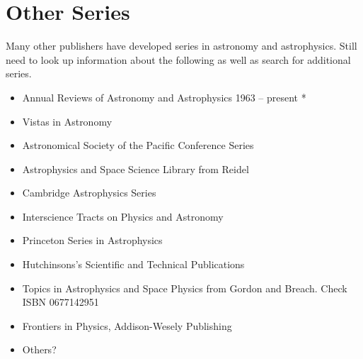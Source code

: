 \section{Other Series}

Many other publishers have developed series in astronomy and
astrophysics.  Still need to look up information about the following
as well as search for additional series.

\begin{itemize}
  \item Annual Reviews of Astronomy and Astrophysics 1963 -- present *
  \item Vistas in Astronomy
  \item Astronomical Society of the Pacific Conference Series
  \item Astrophysics and Space Science Library from Reidel
  \item Cambridge Astrophysics Series
  \item Interscience Tracts on Physics and Astronomy
  \item Princeton Series in Astrophysics
  \item Hutchinsons's Scientific and Technical Publications
  \item Topics in Astrophysics and Space Physics from Gordon and Breach. Check ISBN 0677142951
  \item Frontiers in Physics, Addison-Wesely Publishing    
  \item Others?
\end{itemize}
